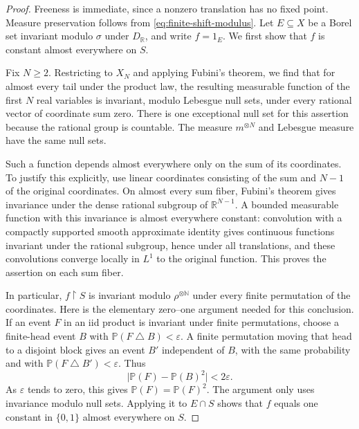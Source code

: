 \documentclass[11pt]{article}
\numberwithin{equation}{section}
\theoremstyle{definition}
\newcommand{\N}{\mathbb N}
\newcommand{\R}{\mathbb R}
\begin{document}
\begin{proof}
Freeness is immediate, since a nonzero translation has no fixed point.
Measure preservation follows from \eqref{eq:finite-shift-modulus}.
Let $E\subseteq X$ be a Borel set invariant modulo $\sigma$ under
$D_{\R}$, and write $f=1_E$. We first show that $f$ is constant almost
everywhere on $S$.

Fix $N\geq2$. Restricting to $X_N$ and applying Fubini's theorem, we find
that for almost every tail under the product law, the resulting measurable function of
the first $N$ real variables is invariant, modulo Lebesgue null sets,
under every rational vector of coordinate sum zero. There is one
exceptional null set for this assertion because the rational group is
countable. The measure $m^{\otimes N}$ and Lebesgue measure have the same
null sets.

Such a function depends almost everywhere only on the sum of its
coordinates. To justify this explicitly, use linear coordinates
consisting of the sum and $N-1$ of the original coordinates. On almost
every sum fiber, Fubini's theorem gives invariance under the dense
rational subgroup of $\R^{N-1}$. A bounded measurable function with
this invariance is almost everywhere constant: convolution with a
compactly supported smooth approximate identity gives continuous
functions invariant under the rational subgroup, hence under all
translations, and these convolutions converge locally in $L^1$ to the
original function. This proves the assertion on each sum fiber.

In particular, $f\mathbin{\upharpoonright}S$ is invariant modulo
$\rho^{\otimes\N}$ under every finite permutation of the coordinates.
Here is the elementary zero--one argument needed for this conclusion.
If an event $F$ in an iid product is invariant under finite permutations,
choose a finite-head event $B$ with
$\mathbb P(F\mathbin{\triangle}B)<\varepsilon$. A finite permutation
moving that head to a disjoint block gives an event $B'$ independent of
$B$, with the same probability and with
$\mathbb P(F\mathbin{\triangle}B')<\varepsilon$. Thus
\[
 \bigl|\mathbb P(F)-\mathbb P(B)^2\bigr|<2\varepsilon.
\]
As $\varepsilon$ tends to zero, this gives
$\mathbb P(F)=\mathbb P(F)^2$. The argument only uses invariance modulo
null sets. Applying it to $E\cap S$ shows that $f$ equals one constant
in $\{0,1\}$ almost everywhere on $S$.


\end{proof}
\end{document}
